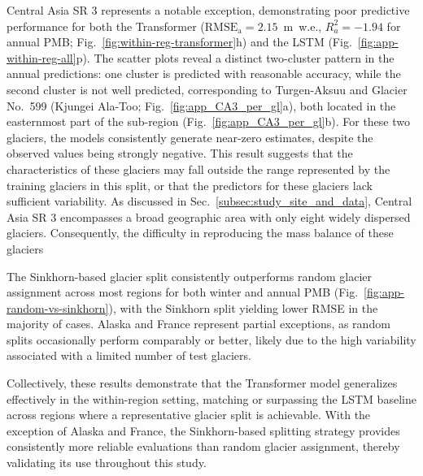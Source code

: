 \documentclass[draft]{agujournal2019}
\begin{document}
Central Asia SR 3 represents a notable exception, demonstrating poor predictive performance for both the Transformer ($\mathrm{RMSE_a} = 2.15$~m~w.e., $R^2_a = -1.94$ for annual PMB; Fig.~\ref{fig:within-reg-transformer}h) and the LSTM (Fig.~\ref{fig:app-within-reg-all}p). The scatter plots reveal a distinct two-cluster pattern in the annual predictions: one cluster is predicted with reasonable accuracy, while the second cluster is not well predicted, corresponding to Turgen-Aksuu and Glacier No.~599 (Kjungei Ala-Too; Fig.~\ref{fig:app_CA3_per_gl}a), both located in the easternmost part of the sub-region (Fig.~\ref{fig:app_CA3_per_gl}b). For these two glaciers, the models consistently generate near-zero estimates, despite the observed values being strongly negative. This result suggests that the characteristics of these glaciers may fall outside the range represented by the training glaciers in this split, or that the predictors for these glaciers lack sufficient variability. As discussed in Sec.~\ref{subsec:study_site_and_data}, Central Asia SR 3 encompasses a broad geographic area with only eight widely dispersed glaciers. Consequently, the difficulty in reproducing the mass balance of these glaciers 

The Sinkhorn-based glacier split consistently outperforms random glacier assignment across most regions for both winter and annual PMB (Fig.~\ref{fig:app-random-vs-sinkhorn}), with the Sinkhorn split yielding lower RMSE in the majority of cases. Alaska and France represent partial exceptions, as random splits occasionally perform comparably or better, likely due to the high variability associated with a limited number of test glaciers.

Collectively, these results demonstrate that the Transformer model generalizes effectively in the within-region setting, matching or surpassing the LSTM baseline across  regions where a representative glacier split is achievable. With the exception of Alaska and France, the Sinkhorn-based splitting strategy provides consistently more reliable evaluations than random glacier assignment, thereby validating its use throughout this study.
\end{document}
